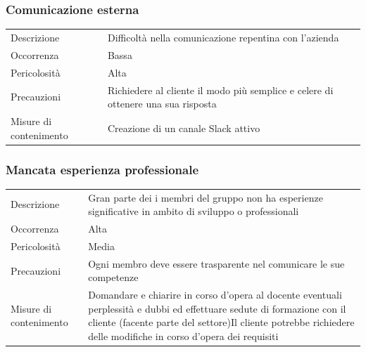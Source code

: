 \documentclass{article}
\begin{document}
\subsubsection{Comunicazione esterna}
\begin{center}
\begin{tabular}{P{10em} P{20em}} 
     Descrizione & Difficoltà nella comunicazione repentina con l'azienda\\ 
    Occorrenza & Bassa\\
    Pericolosità & Alta \\
    Precauzioni & Richiedere al cliente il modo più semplice e celere di ottenere una sua risposta \\
    Misure di contenimento & Creazione di un canale Slack attivo\\
\end{tabular}
\label{tab:comesterna}
\end{center}

\subsubsection{Mancata esperienza professionale}
\begin{center}
\begin{tabular}{P{10em} P{20em}} 
     Descrizione & Gran parte dei i membri del gruppo non ha esperienze significative in ambito di sviluppo o professionali\\ 
    Occorrenza & Alta\\
    Pericolosità & Media \\
    Precauzioni & Ogni membro deve essere trasparente nel comunicare le sue competenze \\
    Misure di contenimento & Domandare e chiarire in corso d'opera al docente eventuali perplessità e dubbi ed effettuare sedute di formazione con il cliente (facente parte del settore)Il cliente potrebbe richiedere delle modifiche in corso d'opera dei requisiti 
 \\
\end{tabular}
\label{tab:espprof}
\end{center}
\end{document}
